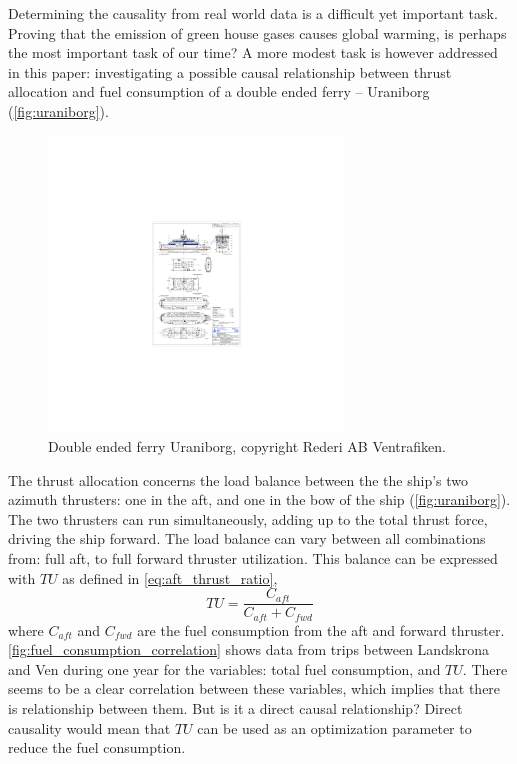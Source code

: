 \documentclass[fleqn,10pt]{olplainarticle}
\begin{document}
Determining the causality from real world data is a difficult yet important task. Proving that the emission of green house gases causes global warming, is perhaps the most important task of our time? A more modest task is however addressed in this paper: investigating a possible causal relationship between thrust allocation and fuel consumption of a double ended ferry -- Uraniborg (\autoref{fig:uraniborg}).  
\begin{figure}[!htb]
    \centering
    \includegraphics[width=0.7\textwidth]{figures/GA_uraniborg.pdf}
    \caption{Double ended ferry Uraniborg, copyright Rederi AB Ventrafiken.}
    \label{fig:uraniborg}
\end{figure}
The thrust allocation concerns the load balance between the the ship's two azimuth thrusters: one in the aft, and one in the bow of the ship (\autoref{fig:uraniborg}). The two thrusters can run simultaneously, adding up to the total thrust force, driving the ship forward. The load balance can vary between all combinations from: full aft, to full forward thruster utilization. This balance can be expressed with $TU$ as defined in \autoref{eq:aft_thrust_ratio},  
\begin{equation}
    TU = \frac{C_{aft}}{C_{aft} + C_{fwd}}
    \label{eq:aft_thrust_ratio}
\end{equation}
where $C_{aft}$ and $C_{fwd}$ are the fuel consumption from the aft and forward thruster. 
\autoref{fig:fuel_consumption_correlation} shows data from trips between Landskrona and Ven during one year for the variables: total fuel consumption, and $TU$. There seems to be a clear correlation between these variables,  which implies that there is relationship between them. But is it a direct causal relationship? Direct causality would mean that $TU$ can be used as an optimization parameter to reduce the fuel consumption.
\end{document}
